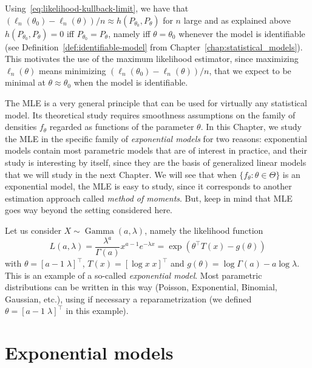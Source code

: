 \documentclass[
	fontsize=11pt, %
	twoside=false, %
	numbers=noenddot, %
]{kaobook}
\DeclareMathOperator{\gam}{Gamma}
\begin{document}
Using~\eqref{eq:likelihood-kullback-limit}, we have that 
$(\ell_n(\theta_0) - \ell_n(\theta)) / n \approx h(P_{\theta_0}, P_\theta)$ for $n$ large and as explained above 
$h(P_{\theta_0}, P_\theta) = 0$ iff $P_{\theta_0} = P_{\theta}$, namely iff $\theta = \theta_0$ whenever the model is identifiable (see Definition~\ref{def:identifiable-model} from Chapter~\ref{chap:statistical_models}).
This motivates the use of the maximum likelihood estimator, since maximizing $\ell_n(\theta)$ means minimizing $(\ell_n(\theta_0) - \ell_n(\theta)) / n$, that we expect to be minimal at $\theta \approx \theta_0$ when the model is identifiable.

The MLE is a very general principle that can be used for virtually any statistical model.
Its theoretical study requires smoothness assumptions on the family of densities $f_\theta$ regarded as functions of the parameter $\theta$.
In this Chapter, we study the MLE in the specific family of \emph{exponential models} for two reasons: exponential models contain most parametric models that are of interest in practice, and  their study is interesting by itself, since they are the basis of generalized linear models that we will study in the next Chapter.
We will see that when $\{ f_\theta : \theta \in \Theta \}$ is an exponential model, the MLE is easy to study, since it corresponds to another estimation approach called \emph{method of moments}.
But, keep in mind that MLE goes way beyond the setting considered here.
\begin{example}
	Let us consider $X \sim \gam(a, \lambda)$, namely the likelihood function
	\begin{equation*}
		L(a, \lambda) = \frac{\lambda^a}{\Gamma(a)} x^{a - 1} e^{-\lambda x} = \exp( \theta^\top T(x) - g(\theta))
	\end{equation*}
	with $\theta = [a - 1 \; \lambda]^\top$, $T(x) = [\log x \; x]^\top$ and $g(\theta) = \log \Gamma(a) - a \log \lambda$.
	This is an example of a so-called \emph{exponential model}. Most parametric distributions can be written in this way (Poisson, Exponential, Binomial, Gaussian, etc.), using if necessary a reparametrization (we defined $\theta = [a - 1 \; \lambda]^\top$ in this example).
\end{example}

\section{Exponential models} %
\label{sec:exponential_models}
\end{document}
